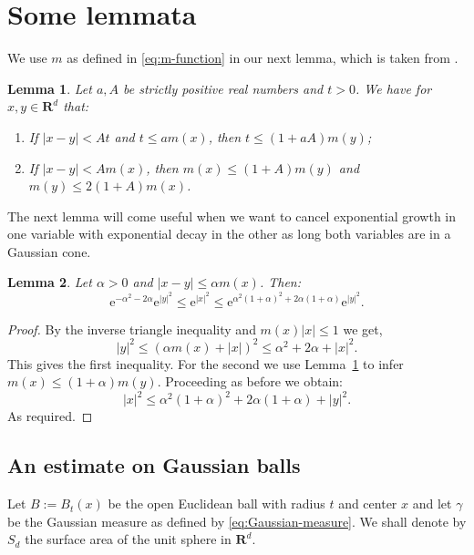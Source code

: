 \documentclass{amsart}
\newtheorem{lemma}{Lemma}
\theoremstyle{remark}
\renewcommand{\leq}{\leqslant}
\newcommand{\R}{\mathbf R}
\newcommand{\e}{\mathrm{e}} %
\begin{document}
\section{Some lemmata}
We use $m$ as defined in \eqref{eq:m-function} in our next lemma,
which is taken from \cite{MaasNeervenPortal2011}.
\begin{lemma}\label{lem:m-xy-equivalence}
  Let $a, A$ be strictly positive real numbers and $t > 0$. We have
  for $x, y \in \R^d$ that:
  \begin{enumerate}
  \item If $|x - y| < A t$ and $t \leq a m(x)$, then $t
    \leq (1 + aA) m(y)$;
  \item If $|x - y| < A m(x)$, then $m(x) \leq (1 +
    A) m(y)$ and $m(y) \leq 2 (1 + A) m(x)$. 
  \end{enumerate}
\end{lemma}

The next lemma will come useful when we want to cancel exponential
growth in one variable with exponential decay in the other as long
both variables are in a Gaussian cone.
\begin{lemma}\label{lem:Cone-Gaussians-comparable}
  Let $\alpha > 0$ and $|x - y| \leq \alpha m(x)$. Then:
  \begin{equation*}
    \e^{-\alpha^2-2\alpha} \e^{|y|^2}
    \leq \e^{|x|^2} \leq
    \e^{\alpha^2(1 + \alpha)^2+2\alpha(1 + \alpha)} \e^{|y|^2} .
  \end{equation*}
\end{lemma}
\begin{proof}
  By the inverse triangle inequality and $m(x)|x| \leq 1$ we get, 
  \begin{equation*}
    |y|^2 \leq (\alpha m(x) + |x|)^2 \leq \alpha^2 + 2 \alpha + |x|^2.
  \end{equation*}
  This gives the first inequality.  For the second we use
  Lemma~\ref{lem:m-xy-equivalence} to infer $m(x) \leq (1 + \alpha)
  m(y)$. Proceeding as before we obtain: 
  \begin{equation*}
    |x|^2 \leq \alpha^2 (1 + \alpha)^2 + 2 \alpha (1 + \alpha) + |y|^2.
  \end{equation*}
  As required.
\end{proof}

\subsection{An estimate on Gaussian balls}
Let $B := B_t(x)$ be the open Euclidean ball with radius $t$ and center $x$
and let $\gamma$ be the Gaussian measure as defined by
\eqref{eq:Gaussian-measure}. We shall denote by $S_d$ the surface area 
of the unit sphere in $\R^d$.
\end{document}
